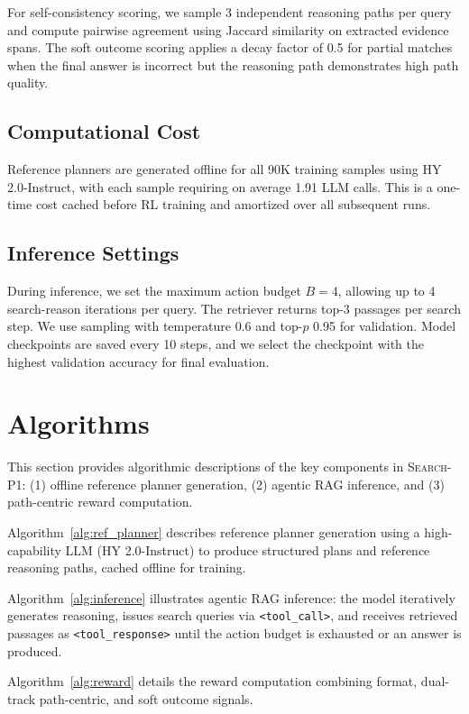 \documentclass[11pt]{article}
\newcommand{\method}{\textsc{Search-P1}\xspace}
\begin{document}
For self-consistency scoring, we sample 3 independent reasoning paths per query and compute pairwise agreement using Jaccard similarity on extracted evidence spans. The soft outcome scoring applies a decay factor of 0.5 for partial matches when the final answer is incorrect but the reasoning path demonstrates high path quality.

\subsection{Computational Cost}
\label{sec:appendix_cost}

Reference planners are generated offline for all 90K training samples using HY 2.0-Instruct, with each sample requiring on average 1.91 LLM calls. This is a one-time cost cached before RL training and amortized over all subsequent runs.

\subsection{Inference Settings}

During inference, we set the maximum action budget $B = 4$, allowing up to 4 search-reason iterations per query. The retriever returns top-3 passages per search step. We use sampling with temperature 0.6 and top-$p$ 0.95 for validation. Model checkpoints are saved every 10 steps, and we select the checkpoint with the highest validation accuracy for final evaluation.

\section{Algorithms}
\label{sec:appendix_algo}

This section provides algorithmic descriptions of the key components in \method: (1) offline reference planner generation, (2) agentic RAG inference, and (3) path-centric reward computation.

Algorithm~\ref{alg:ref_planner} describes reference planner generation using a high-capability LLM (HY 2.0-Instruct) to produce structured plans and reference reasoning paths, cached offline for training.

Algorithm~\ref{alg:inference} illustrates agentic RAG inference: the model iteratively generates reasoning, issues search queries via \texttt{<tool\_call>}, and receives retrieved passages as \texttt{<tool\_response>} until the action budget is exhausted or an answer is produced.

Algorithm~\ref{alg:reward} details the reward computation combining format, dual-track path-centric, and soft outcome signals.
\end{document}
